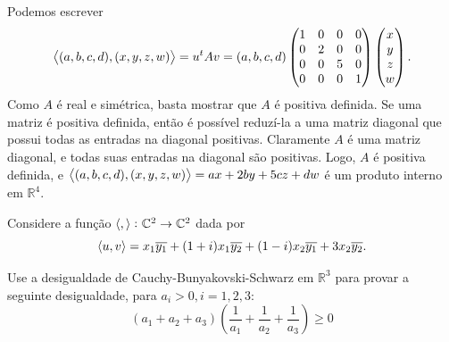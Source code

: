 \documentclass[11pt,a4paper]{article}
\begin{document}
{\begin{itemize}
{    
    \task[\pers{a}] Podemos escrever
    \[
    \left\langle (a,b,c,d), (x,y,z,w) \right\rangle = u^t A v = (a,b,c,d) \begin{pmatrix}
    1 & 0 & 0 & 0 \\
    0 & 2 & 0 & 0 \\
    0 & 0 & 5 & 0 \\
    0 & 0 & 0 & 1 \\
    \end{pmatrix} \begin{pmatrix}
    x\\ y\\ z \\ w
    \end{pmatrix}.
    \]
    Como $A$ é real e simétrica, basta mostrar que $A$ é positiva definida. Se uma matriz é positiva definida, então é possível reduzí-la a uma matriz diagonal que possui todas as entradas na diagonal positivas. Claramente $A$ é uma matriz diagonal, e todas suas entradas na diagonal são positivas. Logo, $A$ é positiva definida, e $\left\langle (a,b,c,d), (x,y,z,w) \right\rangle = ax + 2by + 5cz + dw$ é um produto interno em $\mathbb{R}^4.$
    
    \task[\pers{b}]
    }
    
\end{itemize}


}

 Considere a função $\left\langle , \right\rangle \colon \mathbb{C}^2 \to \mathbb{C}^2$ dada por
\[
\left\langle u,v \right\rangle = x_1\overline{y_1} + (1+i)x_1\overline{y_2} + (1-i)x_2\overline{y_1} + 3x_2\overline{y_2}.
\]

\solucao{}

 Use a desigualdade de Cauchy-Bunyakovski-Schwarz em $\mathbb{R}^3$ para provar a seguinte desigualdade, para $a_i > 0, i = 1,2,3:$
\[
(a_1 + a_2 + a_3) \left( \frac{1}{a_1} + \frac{1}{a_2} + \frac{1}{a_3} \right) \ge 0
\]

\end{document}
